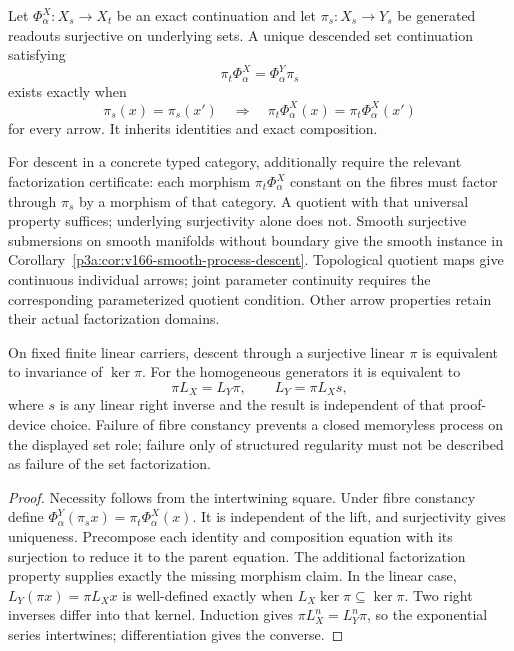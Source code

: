 \documentclass[12pt,a4paper]{article}
\begin{document}
\begin{theorem}
\label{p3a:thm:generated-process-projectability}
Let \(\Phi_\alpha^X:X_s\to X_t\) be an exact continuation and let
\(\pi_s:X_s\to Y_s\) be generated readouts surjective on underlying
sets. A unique descended set continuation satisfying
\[
 \boxed{\pi_t\Phi_\alpha^X=\Phi_\alpha^Y\pi_s}
\]
exists exactly when
\[
 \pi_s(x)=\pi_s(x')\quad\Longrightarrow\quad
 \pi_t\Phi_\alpha^X(x)=\pi_t\Phi_\alpha^X(x')
\]
for every arrow. It inherits identities and exact composition.

For descent in a concrete typed category, additionally require the relevant
factorization certificate: each morphism \(\pi_t\Phi_\alpha^X\)
constant on the fibres must factor through \(\pi_s\) by a morphism of
that category. A quotient with that universal property suffices;
underlying surjectivity alone does not. Smooth surjective submersions on
smooth manifolds without boundary give the smooth instance in
Corollary~\ref{p3a:cor:v166-smooth-process-descent}. Topological quotient
maps give continuous individual arrows; joint parameter continuity requires
the corresponding parameterized quotient condition. Other arrow properties
retain their actual factorization domains.

On fixed finite linear carriers, descent through a surjective linear
\(\pi\) is equivalent to invariance of \(\ker\pi\). For the
homogeneous generators it is equivalent to
\[
 \pi L_X=L_Y\pi,
 \qquad L_Y=\pi L_Xs,
\]
where \(s\) is any linear right inverse and the result is independent of
that proof-device choice. Failure of fibre constancy prevents a closed
memoryless process on the displayed set role; failure only of structured
regularity must not be described as failure of the set factorization.
\end{theorem}
\begin{proof}
Necessity follows from the intertwining square. Under fibre constancy define
\(\Phi_\alpha^Y(\pi_sx)=\pi_t\Phi_\alpha^X(x)\). It is independent
of the lift, and surjectivity gives uniqueness. Precompose each identity and
composition equation with its surjection to reduce it to the parent equation.
The additional factorization property supplies exactly the missing morphism
claim. In the linear case, \(L_Y(\pi x)=\pi L_Xx\) is well-defined
exactly when \(L_X\ker\pi\subseteq\ker\pi\). Two right inverses
differ into that kernel. Induction gives \(\pi L_X^n=L_Y^n\pi\), so
the exponential series intertwines; differentiation gives the converse.
\end{proof}
\end{document}
